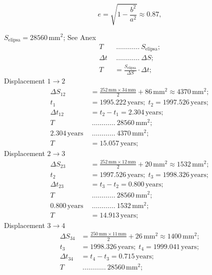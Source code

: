 \begin{description}
\[  \]
  \[
    e = \sqrt{1 - \frac{b^2}{a^2}} \approx 0.87,
  \]
\item[b)] $S_{\mathrm{elipsa}} = 28560\,\mathrm{mm}^2$; See Anex %
  \begin{align*}
    T\ &\ \dots\dots\dots\dots\ S_{\mathrm{elipsa}};\\
    \Delta t\ &\ \dots\dots\dots\dots\ \Delta S;\\
    T &= \frac{S_{\mathrm{elipsa}}}{\Delta S}\cdot\Delta t;
  \end{align*}
  Displacement $1 \rightarrow 2$
  \begin{align*}
    \Delta S_{12} &= \frac{252\,\mathrm{mm}\times34\,\mathrm{mm}}{2}
      + 86\,\mathrm{mm}^2 \approx 4370\,\mathrm{mm}^2;\\
    t_1 &= 1995.222\,\mathrm{years};\; t_2 = 1997.526\,\mathrm{years};\\
    \Delta t_{12} &= t_2 - t_1 = 2.304\,\mathrm{years};\\
    T\ &\ \dots\dots\dots\dots\ 28560\,\mathrm{mm}^2;\\
    2.304\,\mathrm{years}\ &\ \dots\dots\dots\dots\ 4370\,\mathrm{mm}^2;\\
    T &= 15.057\,\mathrm{years};
  \end{align*}
  Displacement $2 \rightarrow 3$
  \begin{align*}
    \Delta S_{23} &= \frac{252\,\mathrm{mm}\times12\,\mathrm{mm}}{2}
      + 20\,\mathrm{mm}^2 \approx 1532\,\mathrm{mm}^2;\\
    t_2 &= 1997.526\,\mathrm{years};\; t_3 = 1998.326\,\mathrm{years};\\
    \Delta t_{23} &= t_3 - t_2 = 0.800\,\mathrm{years};\\
    T\ &\ \dots\dots\dots\dots\ 28560\,\mathrm{mm}^2;\\
    0.800\,\mathrm{years}\ &\ \dots\dots\dots\dots\ 1532\,\mathrm{mm}^2;\\
    T &= 14.913\,\mathrm{years};
  \end{align*}
  Displacement $3 \rightarrow 4$
  \begin{align*}
    \Delta S_{34} &= \frac{250\,\mathrm{mm}\times11\,\mathrm{mm}}{2}
      + 26\,\mathrm{mm}^2 \approx 1400\,\mathrm{mm}^2;\\
    t_3 &= 1998.326\,\mathrm{years};\; t_4 = 1999.041\,\mathrm{years};\\
    \Delta t_{34} &= t_4 - t_3 = 0.715\,\mathrm{years};\\
    T\ &\ \dots\dots\dots\dots\ 28560\,\mathrm{mm}^2;\\

\end{align*}
\end{description}
